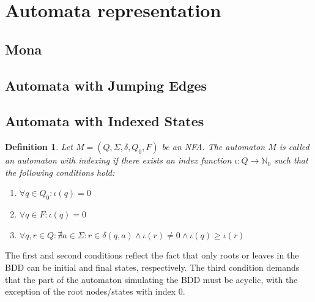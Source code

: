 \documentclass[pdflatex,sn-mathphys-num]{sn-jnl}%
\theoremstyle{thmstyleone}%
\theoremstyle{thmstyletwo}%
\theoremstyle{thmstylethree}%
\newtheorem{definition}{Definition}%
\begin{document}
\section{Automata representation}
    \subsection{Mona}
    \subsection{Automata with Jumping Edges}
    \subsection{Automata with Indexed States}
        \begin{definition}
            Let $M = (Q, \Sigma, \delta, Q_0, F)$ be an NFA. The automaton $M$ is called an automaton with indexing if there exists an index function $\iota : Q \rightarrow \mathbb{N}_0$ such that the following conditions hold:
            \begin{enumerate}[noindent]
                \item $\forall q \in Q_0 : \iota(q) = 0$
                \item $\forall q \in F : \iota(q) = 0$
                \item $\forall q, r \in Q : \nexists a \in \Sigma : r \in \delta(q, a) \land \iota(r) \neq 0 \land \iota(q) \geq \iota(r)$
            \end{enumerate}
        \end{definition}

        The first and second conditions reflect the fact that only roots or leaves in the BDD can be initial and final states, respectively. The third condition demands that the part of the automaton simulating the BDD must be acyclic, with the exception of the root nodes/states with index 0.






\end{document}
